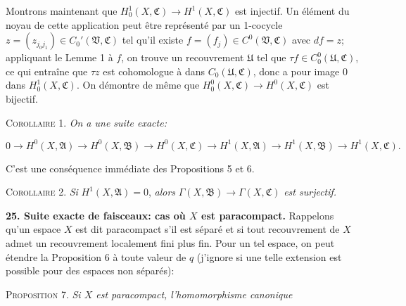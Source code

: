 Montrons maintenant que $H_0^1(X, \mathfrak{C}) \rightarrow H^1(X, \mathfrak{C})$ est injectif. Un élément du noyau de cette application peut être représenté par un 1-cocycle $z = (z_{j_0 j_1}) \in C_0'(\mathfrak{V}, \mathfrak{C})$ tel qu'il existe $f = (f_j) \in C^0(\mathfrak{V}, \mathfrak{C})$ avec $df = z$; appliquant le Lemme 1 à $f$, on trouve un recouvrement $\mathfrak{U}$ tel que $\tau f \in C_0^0(\mathfrak{U}, \mathfrak{C})$, ce qui entraîne que $\tau z$ est cohomologue à \quad dans $C_0(\mathfrak{U}, \mathfrak{C})$, donc a pour image 0 dans $H_0^1(X, \mathfrak{C})$. On démontre de même que $H_0^0(X, \mathfrak{C}) \rightarrow H^0(X, \mathfrak{C})$ est bijectif.

\textsc{Corollaire} 1. \textit{On a une suite exacte:}

\begin{equation*}
0 \rightarrow H^0(X, \mathfrak{A}) \rightarrow H^0(X, \mathfrak{B}) \rightarrow H^0(X, \mathfrak{C}) \rightarrow H^1(X, \mathfrak{A}) \rightarrow H^1(X, \mathfrak{B}) \rightarrow H^1(X, \mathfrak{C}).
\end{equation*}

C'est une conséquence immédiate des Propositions 5 et 6.

\textsc{Corollaire} 2. \textit{Si} $H^1(X, \mathfrak{A}) = 0$, \textit{alors} $\Gamma(X, \mathfrak{B}) \rightarrow \Gamma(X, \mathfrak{C})$ \textit{est surjectif.}

\textbf{25. Suite exacte de faisceaux: cas où $X$ est paracompact.} Rappelons qu'un espace $X$ est dit paracompact s'il est séparé et si tout recouvrement de $X$ admet un recouvrement localement fini plus fin. Pour un tel espace, on peut étendre la Proposition 6 à toute valeur de $q$ (j'ignore si une telle extension est possible pour des espaces non séparés):



%
%
%
\textsc{Proposition} 7. \textit{Si $X$ est paracompact, l'homomorphisme canonique}

